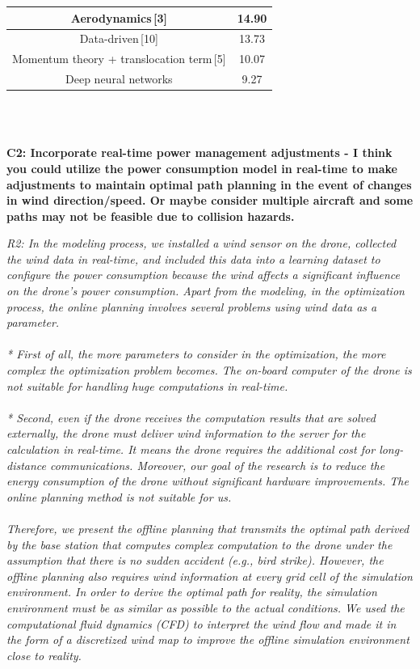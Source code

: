 \documentclass[onecolumn]{IEEEconf}
\begin{document}
\begin{description}
\begin{mdframed}[ linewidth=.75pt, userdefinedwidth=0.9\textwidth]
{\begin{tabular}{|c|c|}
    {Aerodynamics\,[3]}          & { 14.90}           \\ \hline
    {Data-driven\,[10]}           & { 13.73}           \\ \hline
    {Momentum theory + translocation term\,[5]}       & { 10.07}           \\ \hline
    {Deep neural networks}  & { 9.27}            \\ \hline
    \end{tabular}%
    }
    \end{mdframed} 
	~\\
	~\\
    \item \textbf
    {
	C2: Incorporate real-time power management adjustments - I think you could utilize the power consumption model in real-time to make adjustments to maintain optimal path planning in the event of changes in wind direction/speed. Or maybe consider multiple aircraft and some paths may not be feasible due to collision hazards.
	}
	\item \textit
	{
	R2: In the modeling process, we installed a wind sensor on the drone, collected the wind data in real-time, and included this data into a learning dataset to configure the power consumption because the wind affects a significant influence on the drone’s power consumption.
    Apart from the modeling, in the optimization process, the online planning involves several problems using wind data as a parameter.~\\~\\
    * First of all, the more parameters to consider in the optimization, the more complex the optimization problem becomes. The on-board computer of the drone is not suitable for handling huge computations in real-time.~\\~\\
    * Second, even if the drone receives the computation results that are solved externally, the drone must deliver wind information to the server for the calculation in real-time. It means the drone requires the additional cost for long-distance communications. Moreover, our goal of the research is to reduce the energy consumption of the drone without significant hardware improvements. The online planning method is not suitable for us.~\\~\\
    Therefore, we present the offline planning that transmits the optimal path derived by the base station that computes complex computation to the drone under the assumption that there is no sudden accident (e.g., bird strike). However, the offline planning also requires wind information at every grid cell of the simulation environment. In order to derive the optimal path for reality, the simulation environment must be as similar as possible to the actual conditions. We used the computational fluid dynamics (CFD) to interpret the wind flow and made it in the form of a discretized wind map to improve the offline simulation environment close to reality.~\\~\\
}
\end{description}
\end{document}
